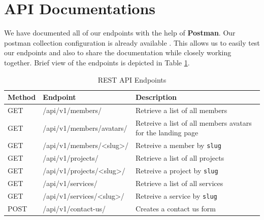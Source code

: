 \section{API Documentations}
We have documented all of our endpoints with the help of \textbf{Postman}.
Our postman collection configuration is already available \href{https://api.postman.com/collections/8585418-bc188eb6-bb3e-4c84-94e9-4ba6ab9a8a80?access_key=PMAT-01J309WW0GVKMFHF6XSXX982ZG}{}.
This allows us to easily test our endpoints and also to share the documentation while closely working together.
Brief view of the endpoints is depicted in Table \ref{table:endpoints}.
\\

\begin{table}[h!]
    \centering
    \begin{tabular}{| m{2cm} | m{5cm} | m{6cm} |}
    \hline
    \textbf{Method} & \textbf{Endpoint} & \textbf{Description} \\
    \hline
    GET & /api/v1/members/ & Retrieve a list of all members \\
    \hline
    GET & /api/v1/members/avatars/ & Retreive a list of all members avatars for the landing page \\
    \hline
    GET & /api/v1/members/<slug>/ & Retreive a member by \texttt{slug} \\
    \hline
    GET & /api/v1/projects/ & Retrieve a list of all projects \\
    \hline
    GET & /api/v1/projects/<slug>/ & Retreive a project by \texttt{slug} \\
    \hline
    GET & /api/v1/services/ & Retrieve a list of all services \\
    \hline
    GET & /api/v1/services/<slug>/ & Retreive a service by \texttt{slug} \\
    \hline
    POST & /api/v1/contact-us/ & Creates a contact us form \\
    \hline
    \end{tabular}
    \caption{REST API Endpoints}
    \label{table:endpoints}
\end{table}
